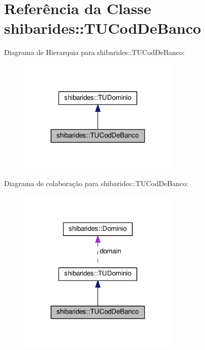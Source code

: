 \hypertarget{classshibarides_1_1TUCodDeBanco}{}\section{Referência da Classe shibarides\+:\+:T\+U\+Cod\+De\+Banco}
\label{classshibarides_1_1TUCodDeBanco}


Diagrama de Hierarquia para shibarides\+:\+:T\+U\+Cod\+De\+Banco\+:\nopagebreak
\begin{figure}[H]
\begin{center}
\leavevmode
\includegraphics[width=219pt]{classshibarides_1_1TUCodDeBanco__inherit__graph}
\end{center}
\end{figure}


Diagrama de colaboração para shibarides\+:\+:T\+U\+Cod\+De\+Banco\+:\nopagebreak
\begin{figure}[H]
\begin{center}
\leavevmode
\includegraphics[width=219pt]{classshibarides_1_1TUCodDeBanco__coll__graph}
\end{center}
\end{figure}
